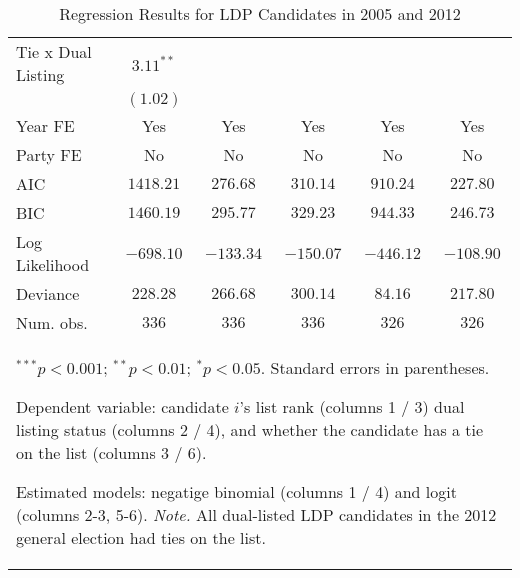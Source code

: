 \begin{table}
\begin{center}
\begin{tabular}{l c c c c c}
Tie x Dual Listing & $3.11^{**}$   &              &              &               &              \\
                   & $(1.02)$      &              &              &               &              \\
\hline
Year FE            & Yes           & Yes          & Yes          & Yes           & Yes          \\
Party FE           & No            & No           & No           & No            & No           \\
AIC                & $1418.21$     & $276.68$     & $310.14$     & $910.24$      & $227.80$     \\
BIC                & $1460.19$     & $295.77$     & $329.23$     & $944.33$      & $246.73$     \\
Log Likelihood     & $-698.10$     & $-133.34$    & $-150.07$    & $-446.12$     & $-108.90$    \\
Deviance           & $228.28$      & $266.68$     & $300.14$     & $84.16$       & $217.80$     \\
Num. obs.          & $336$         & $336$        & $336$        & $326$         & $326$        \\
\hline
\multicolumn{6}{l}{\scriptsize{\item $^{***}p<0.001$; $^{**}p<0.01$; $^{*}p<0.05$. Standard errors in parentheses.
\item Dependent variable: candidate $i$'s list rank (columns 1 / 3) dual listing status (columns 2 / 4), and whether the candidate has a tie on the list (columns 3 / 6).
\item Estimated models: negatige binomial (columns 1 / 4) and logit (columns 2-3, 5-6). 
\textit{Note.} All dual-listed LDP candidates in the 2012 general election had ties on the list.}}
\end{tabular}
\caption{Regression Results for LDP Candidates in 2005 and 2012}
\label{tab:ldp_2005_2012}
\end{center}
\end{table}
